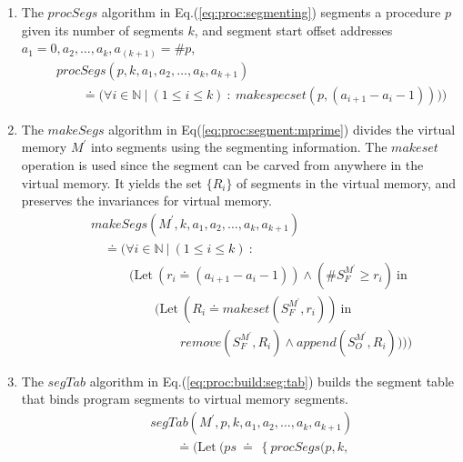 \documentclass[draft]{article}
\def\names{\doteq}
\begin{document}
\begin{enumerate}
\item   The  $procSegs$  algorithm   in  Eq.(\ref{eq:proc:segmenting})
  segments  a procedure  $p$ given  its  number of  segments $k$,  and
  segment start offset addresses $a_1 = 0, a_2, \ldots, a_k, a_{(k+1)}
  = \#p$,  
  \begin{eqnarray}
    \label{eq:proc:segmenting}
    &~&
    procSegs(p, k, a_1, a_2, \ldots, a_k, a_{k+1}) 
    \nonumber \\
    &~& \quad \quad \names \biggl(
    \forall i \in \mathbb{N}\ \vert\ (1 \le i \le k)\ :\ 
    makespecset(p, (a_{i+1} - a_i - 1))
    \bigr)\biggr)
  \end{eqnarray}
\item  The  $makeSegs$  algorithm in  Eq(\ref{eq:proc:segment:mprime})
  divides  the  virtual  memory  $M^\prime$ into  segments  using  the
  segmenting information.   The $makeset$ operation is  used since the
  segment  can be  carved from  anywhere  in the  virtual memory.   It
  yields  the set  $\{R_i\}$ of  segments in  the virtual  memory, and
  preserves the invariances for virtual memory.
  \begin{eqnarray}
    \label{eq:proc:segment:mprime}
    &~&
    makeSegs(M^\prime, k, a_1, a_2, \ldots, a_k, a_{k+1}) 
    \nonumber \\
    &~& \quad
    \names \biggl(
    \forall i \in \mathbb{N}\ \vert\ (1 \le i \le k)\ :\ 
    \nonumber \\
    &~& \quad \quad  \quad
    \bigl(\mathrm{Let}\ (r_i \names (a_{i+1} - a_i - 1)) \wedge
    (\#S_F^{M^\prime} \ge r_i)\ \mathrm{in} 
    \nonumber \\
    &~& \quad \quad \quad \quad  \quad(\mathrm{Let}\ (R_i \names
    makeset(S_F^{M^\prime}, r_i)) \ \mathrm{in}  
    \nonumber \\
    &~& \quad \quad \quad \quad \quad \quad  \quad
    remove (S_F^{M^\prime}, R_i) \wedge
    append(S_O^{M^\prime}, R_i)
    )\bigr)\biggr)
  \end{eqnarray}
\item  The   $segTab$  algorithm  in  Eq.(\ref{eq:proc:build:seg:tab})
  builds  the segment  table that  binds program  segments  to virtual
  memory segments.
  \begin{eqnarray}
    \label{eq:proc:build:seg:tab}
    &~&
    segTab (M^\prime, p, k, a_1, a_2, \ldots, a_k, a_{k+1})
    \nonumber \\
    &~& \quad \quad  
    \names \biggl(
    \mathrm{Let}\ (ps\ \names\ \left\{procSegs(p, k,

\end{eqnarray}
\end{enumerate}
\end{document}
